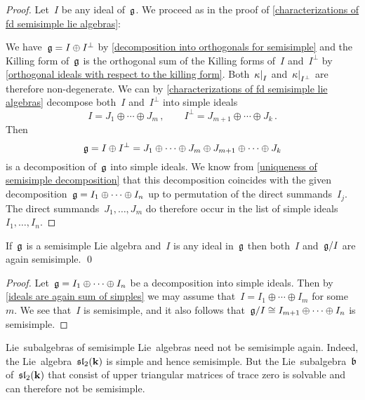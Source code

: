\begin{proof}
  Let~$I$ be any ideal of~$\mathfrak{g}$.
  We proceed as in the proof of \cref{characterizations of fd semisimple lie algebras}:
  
  We have~$\mathfrak{g} = I \oplus I^\perp$ by \cref{decomposition into orthogonals for semisimple} and the Killing form of~$\mathfrak{g}$ is the orthogonal sum of the Killing forms of~$I$ and~$I^\perp$ by \cref{orthogonal ideals with respect to the killing form}.
  Both~$\restrict{\kappa}{I}$ and~$\restrict{\kappa}{I^\perp}$ are therefore non-degenerate.
  We can by \cref{characterizations of fd semisimple lie algebras} decompose both~$I$ and~$I^\perp$ into simple ideals
  \[
    I
    =
    J_1 \oplus \dotsb \oplus J_m \,,
    \qquad
    I^\perp
    =
    J_{m+1} \oplus \dotsb \oplus J_k  \,.
  \]
  Then
  \[
    \mathfrak{g}
    =
    I \oplus I^\perp
    =
    J_1 \oplus \dotsb \oplus J_m \oplus J_{m+1} \oplus \dotsb \oplus J_k
  \]
  is a decomposition of~$\mathfrak{g}$ into simple ideals.
  We know from \cref{uniqueness of semisimple decomposition} that this decomposition coincides with the given decomposition~$\mathfrak{g} = I_1 \oplus \dotsb \oplus I_n$ up to permutation of the direct summands~$I_j$.
  The direct summands~$J_1, \dotsc, J_m$ do therefore occur in the list of simple ideals~$I_1, \dotsc, I_n$.
\end{proof}


\begin{corollary}
  \label{ideals and quotients of semisimple again semisimple}
  If~$\mathfrak{g}$ is a semisimple Lie algebra and~$I$ is any ideal in~$\mathfrak{g}$ then both~$I$ and~$\mathfrak{g}/I$ are again semisimple.
  \qed
\end{corollary}


\begin{proof}
  Let~$\mathfrak{g} = I_1 \oplus \dotsb \oplus I_n$ be a decomposition into simple ideals.
  Then by \cref{ideals are again sum of simples} we may assume that~$I = I_1 \oplus \dotsb \oplus I_m$ for some~$m$.
  We see that~$I$ is semisimple, and it also follows that~$\mathfrak{g}/I \cong I_{m+1} \oplus \dotsb \oplus I_n$ is semisimple.
\end{proof}


\begin{warning}
  Lie~subalgebras of semisimple Lie~algebras need not be semisimple again.
  Indeed, the Lie~algebra~$\mathfrak{sl}_2(\mathbf{k})$ is simple and hence semisimple.
  But the Lie~subalgebra~$\mathfrak{b}$ of~$\mathfrak{sl}_2(\mathbf{k})$ that consist of upper triangular matrices of trace zero is solvable and can therefore not be semisimple.
\end{warning}


